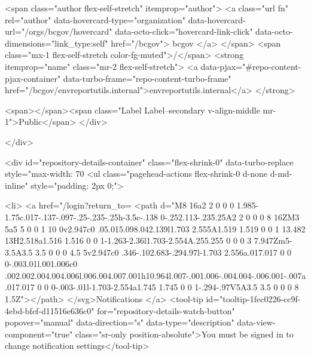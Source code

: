     <span class="author flex-self-stretch" itemprop="author">
      <a class="url fn" rel="author" data-hovercard-type="organization" data-hovercard-url="/orgs/bcgov/hovercard" data-octo-click="hovercard-link-click" data-octo-dimensions="link_type:self" href="/bcgov">
        bcgov
</a>    </span>
    <span class="mx-1 flex-self-stretch color-fg-muted">/</span>
    <strong itemprop="name" class="mr-2 flex-self-stretch">
      <a data-pjax="#repo-content-pjax-container" data-turbo-frame="repo-content-turbo-frame" href="/bcgov/envreportutils.internal">envreportutils.internal</a>
    </strong>

    <span></span><span class="Label Label--secondary v-align-middle mr-1">Public</span>
  </div>


        </div>

        <div id="repository-details-container" class="flex-shrink-0" data-turbo-replace style="max-width: 70%
            <ul class="pagehead-actions flex-shrink-0 d-none d-md-inline" style="padding: 2px 0;">
    
      

  <li>
            <a href="/login?return_to=%
    <path d="M8 16a2 2 0 0 0 1.985-1.75c.017-.137-.097-.25-.235-.25h-3.5c-.138 0-.252.113-.235.25A2 2 0 0 0 8 16ZM3 5a5 5 0 0 1 10 0v2.947c0 .05.015.098.042.139l1.703 2.555A1.519 1.519 0 0 1 13.482 13H2.518a1.516 1.516 0 0 1-1.263-2.36l1.703-2.554A.255.255 0 0 0 3 7.947Zm5-3.5A3.5 3.5 0 0 0 4.5 5v2.947c0 .346-.102.683-.294.97l-1.703 2.556a.017.017 0 0 0-.003.01l.001.006c0 .002.002.004.004.006l.006.004.007.001h10.964l.007-.001.006-.004.004-.006.001-.007a.017.017 0 0 0-.003-.01l-1.703-2.554a1.745 1.745 0 0 1-.294-.97V5A3.5 3.5 0 0 0 8 1.5Z"></path>
</svg>Notifications
</a>    <tool-tip id="tooltip-1fec0226-cc9f-4ebd-bfef-d11516e636c0" for="repository-details-watch-button" popover="manual" data-direction="s" data-type="description" data-view-component="true" class="sr-only position-absolute">You must be signed in to change notification settings</tool-tip>

